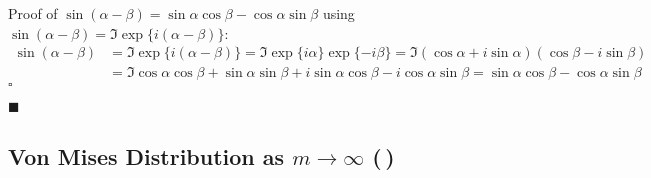 \documentclass[11pt, a4paper]{scrartcl}
\newcommand{\given}{\,\vert\,}
\newcommand{\qed}{\hfill\(\square\)}
\newcommand{\eot}{\hfill\(\blacksquare\)}
\newcommand{\diffstar}{\texorpdfstring{\raisebox{-1pt}{\resizebox{!}{8pt}{\(\star\)}}}{*}}
\newcommand{\twostar}  {(\diffstar\,\diffstar)}
\begin{document}
			\noindent
			Proof of \( \sin(\alpha - \beta) = \sin\alpha \cos\beta - \cos\alpha \sin\beta \) using \( \sin(\alpha - \beta) = \Im{ \exp\big\{ i (\alpha - \beta) \} } \):
			\begin{align}
				\sin(\alpha - \beta)
					&= \Im{ \exp\big\{ i (\alpha - \beta) \} }
					 = \Im{ \exp\{i\alpha\} \exp\{-i\beta\} }
					 = \Im{ (\cos\alpha + i \sin\alpha) (\cos\beta - i \sin\beta) } \\
					&= \Im{ \cos\alpha \cos\beta + \sin\alpha \sin\beta + i \sin\alpha \cos\beta - i \cos\alpha \sin\beta }
					 = \sin\alpha \cos\beta - \cos\alpha \sin\beta
			\end{align}
			\qed

			\eot

		\subsection{Von Mises Distribution as \( m \to \infty \)  \twostar}
\end{document}
